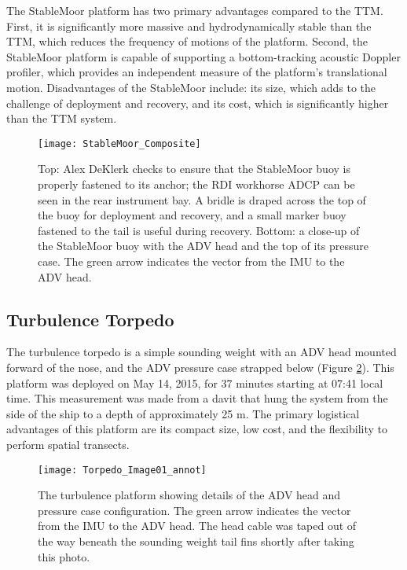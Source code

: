 The StableMoor platform has two primary advantages compared to the TTM. First, it is significantly more massive and hydrodynamically stable than the TTM, which reduces the frequency of motions of the platform. Second, the StableMoor platform is capable of supporting a bottom-tracking acoustic Doppler profiler, which provides an independent measure of the platform's translational motion. Disadvantages of the StableMoor include: its size, which adds to the challenge of deployment and recovery, and its cost, which is significantly higher than the TTM system.

\begin{figure}[t]
  \centering
  \texttt{[image: StableMoor\_Composite]}
  \caption{Top: Alex DeKlerk checks to ensure that the StableMoor buoy is properly fastened to its anchor; the RDI workhorse ADCP can be seen in the rear instrument bay. A bridle is draped across the top of the buoy for deployment and recovery, and a small marker buoy fastened to the tail is useful during recovery.  Bottom: a close-up of the StableMoor buoy with the ADV head and the top of its pressure case. The green arrow indicates the vector from the IMU to the ADV head. 
}
  \label{fig:SM}
\end{figure}

\subsection{Turbulence Torpedo}

The turbulence torpedo is a simple sounding weight with an ADV head mounted forward of the nose, and the ADV pressure case strapped below (Figure \ref{fig:torpedo}). This platform was deployed on May 14, 2015, for 37 minutes starting at 07:41 local time.  This measurement was made from a davit that hung the system from the side of the ship to a depth of approximately 25 m. The primary logistical advantages of this platform are its compact size, low cost, and the flexibility to perform spatial transects.  

\begin{figure}[th]
  \centering
  \texttt{[image: Torpedo\_Image01\_annot]}
  \caption{The turbulence platform showing details of the ADV head and pressure case configuration. The green arrow indicates the vector from the IMU to the ADV head. The head cable was taped out of the way beneath the sounding weight tail fins shortly after taking this photo.}
  \label{fig:torpedo}
\end{figure}

